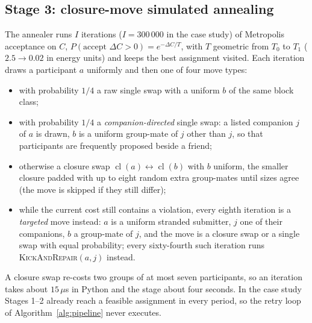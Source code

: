 \documentclass[11pt,a4paper]{article}
\theoremstyle{plain}
\theoremstyle{definition}
\theoremstyle{remark}
\newcommand{\cl}{\operatorname{cl}}
\begin{document}
\subsection{Stage 3: closure-move simulated annealing}
The annealer runs $I$ iterations ($I = 300\,000$ in the case study) of Metropolis acceptance on $C$, $P(\text{accept } \Delta C > 0) = e^{-\Delta C / T}$, with $T$ geometric from $T_0$ to $T_1$ ($2.5 \to 0.02$ in energy units) and keeps the best assignment visited. Each iteration draws a participant $a$ uniformly and then one of four move types:
\begin{itemize}
\item with probability $1/4$ a raw single swap with a uniform $b$ of the same block class;
\item with probability $1/4$ a \emph{companion-directed} single swap: a listed companion $j$ of $a$ is drawn, $b$ is a uniform group-mate of $j$ other than $j$, so that participants are frequently proposed beside a friend;
\item otherwise a closure swap $\cl(a) \leftrightarrow \cl(b)$ with $b$ uniform, the smaller closure padded with up to eight random extra group-mates until sizes agree (the move is skipped if they still differ);
\item while the current cost still contains a violation, every eighth iteration is a \emph{targeted} move instead: $a$ is a uniform stranded submitter, $j$ one of their companions, $b$ a group-mate of $j$, and the move is a closure swap or a single swap with equal probability; every sixty-fourth such iteration runs \textsc{KickAndRepair}$(a, j)$ instead.
\end{itemize}
A closure swap re-costs two groups of at most seven participants, so an iteration takes about $15\,\mu$s in Python and the stage about four seconds. In the case study Stages 1--2 already reach a feasible assignment in every period, so the retry loop of Algorithm~\ref{alg:pipeline} never executes.
\end{document}
